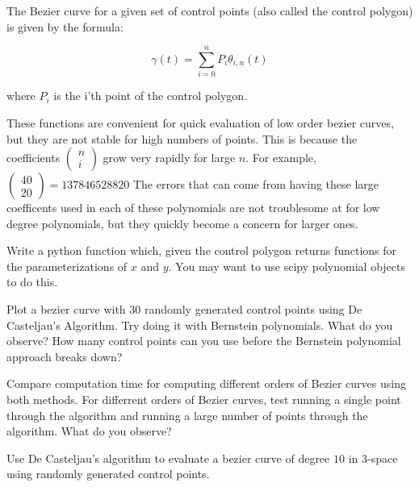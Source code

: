 The Bezier curve for a given set of control points (also called the control polygon) is given by the formula:

$$\gamma (t) = \sum_{i=0}^n P_i \theta_{i,n} (t)$$ 

where $P_i$ is the i'th point of the control polygon.

These functions are convenient for quick evaluation of low order bezier curves, but they are not stable for high numbers of points. This is because the coefficients $\left( \begin{smallmatrix} n\\ i \end{smallmatrix} \right)$ grow very rapidly for large $n$. For example, $\left( \begin{smallmatrix} 40\\ 20 \end{smallmatrix} \right)=137846528820$ The errors that can come from having these large coefficents used in each of these polynomials are not troublesome at for low degree polynomials, but they quickly become a concern for larger ones. 

\begin{problem}
Write a python function which, given the control polygon returns functions for the parameterizations of $x$ and $y$. You may want to use scipy polynomial objects to do this.
\end{problem}

\begin{problem}
Plot a bezier curve with 30 randomly generated control points using De Casteljau's Algorithm. Try doing it with Bernstein polynomials. What do you observe? How many control points can you use before the Bernstein polynomial approach breaks down?
\end{problem}

\begin{problem}
Compare computation time for computing different orders of Bezier curves using both methods. For differrent orders of Bezier curves, test running a single point through the algorithm and running a large number of points through the algorithm. What do you observe?
\end{problem}

\begin{problem}
Use De Casteljau's algorithm to evaluate a bezier curve of degree $10$ in 3-space using randomly generated control points.
\end{problem}

